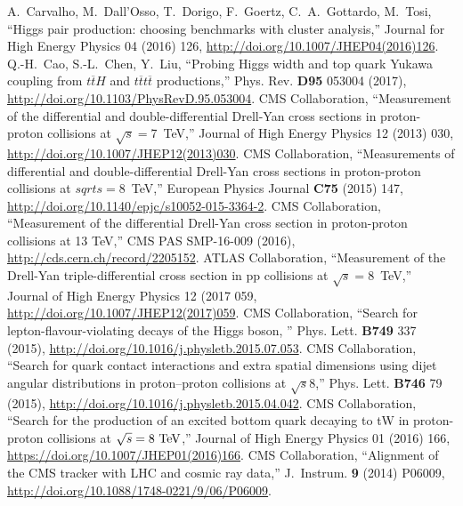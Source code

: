 \begin{thebibliography}{99}
%
    A.~Carvalho, M.~Dall’Osso, T.~Dorigo, F.~Goertz, C.~A.~Gottardo, M.~Tosi,
    ``Higgs pair production: choosing benchmarks with cluster analysis,''
    Journal for High Energy Physics 04 (2016) 126, \url{http://doi.org/10.1007/JHEP04(2016)126}.
%
%
    Q.-H.~Cao, S.-L.~Chen, Y.~Liu,
    ``Probing Higgs width and top quark Yukawa coupling from $t\overline{t}H$ and $t\overline{t}t\overline{t}$ productions,''
    Phys. Rev. {\bf D95} 053004 (2017), \url{http://doi.org/10.1103/PhysRevD.95.053004}.
%
%
    CMS Collaboration, ``Measurement of the differential and double-differential Drell-Yan cross sections in proton-proton collisions at $\sqrt{s}=$7~TeV,''
    Journal of High Energy Physics 12 (2013) 030, \url{http://doi.org/10.1007/JHEP12(2013)030}.
%
    CMS Collaboration, ``Measurements of differential and double-differential Drell-Yan cross sections in proton-proton collisions at $sqrt{s}=$8~TeV,''
    European Physics Journal {\bf C75} (2015) 147, \url{http://doi.org/10.1140/epjc/s10052-015-3364-2}.
%
    CMS Collaboration, ``Measurement of the differential Drell-Yan cross section in proton-proton collisions at 13 TeV,'' 
    CMS PAS SMP-16-009 (2016), \url{http://cds.cern.ch/record/2205152}.
%
    ATLAS Collaboration, ``Measurement of the Drell-Yan triple-differential cross section in pp collisions at $\sqrt{s}=$8~TeV,''
    Journal of High Energy Physics 12 (2017 059, \url{http://doi.org/10.1007/JHEP12(2017)059}.
%
%
 CMS Collaboration, ``Search for lepton-flavour-violating decays of the Higgs boson, '' Phys. Lett. {\bf B749} 337 (2015), \url{http://doi.org/10.1016/j.physletb.2015.07.053}.
%
CMS Collaboration, ``Search for quark contact interactions and extra spatial dimensions using dijet angular distributions in proton–proton collisions at $\sqrt{s}$8\TeV,'' Phys. Lett. {\bf B746} 79 (2015), \url{http://doi.org/10.1016/j.physletb.2015.04.042}.
%
CMS Collaboration, ``Search for the production of an excited bottom quark decaying to tW in proton-proton collisions at $\sqrt{s} = 8\TeV$,'' Journal of High Energy Physics 01 (2016) 166,  \url{https://doi.org/10.1007/JHEP01(2016)166}.
%
%
CMS Collaboration, ``Alignment of the CMS tracker with LHC and cosmic ray data,'' J.~Instrum. \textbf{9} (2014) P06009, 
\url{http://doi.org/10.1088/1748-0221/9/06/P06009}.

\end{thebibliography}
